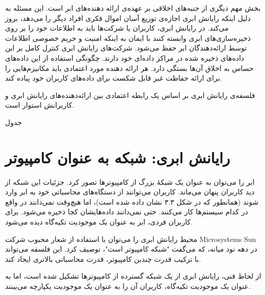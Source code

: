 \documentclass{book}
\begin{document}
            بخش مهم دیگری از جنبه‌های اخلاقی بر عهده‌ی ارائه دهنده‌های ابر است. این مسئله به دلیل اینکه رایانش ابری اجازه‌ی توزیع آسان اموال فکری افراد دیگر را می‌دهد، بروز می‌کند. در رایانش ابری، کاربران یا شرکت‌ها باید به اطلاعات خود را بر روی ذخیره‌سازی‌های ابری وابسته کنند با ایمان به اینکه امنیت و حریم خصوصی اطلاعات توسط ارائه‌دهندگان ابر حفظ می‌شود. شرکت‌های رایانش ابری کنترل کامل بر این داده‌های ذخیره شده در مراکز داده‌ای خود دارند. چگونگی استفاده از این داده‌های حساس به اخلاق آن‌ها بستگی دارد. هر ارائه دهنده مورد اعتمادی باید مکانیزم‌هایی را برای ارائه حفاظت غیر قابل شکست برای داده‌های کاربران خود پیاده کند.

            \begin{addinfo}
                
                فلسفه‌ی رایانش ابری بر اساس یک رابطه اعتمادی بین ارائه‌دهنده‌های رایانش ابری و کاربرانش استوار است.

            \end{addinfo}

            \begin{center}
                
                جدول

            \end{center}

        \section{رایانش ابری: شبکه به عنوان کامپیوتر}

            ابر را می‌توان به عنوان یک شبکهٔ بزرگ از کامپیوترها تصور کرد. جزئیات این شبکه از دید کاربران پنهان می‌ماند. کاربران می‌توانند از دستگاه‌های محاسباتی خود به ابر وارد شوند (همانطور که در شکل ۳.۳ نشان داده شده است)، اما هیچ‌وقت نمی‌دانند در واقع در کدام سیستم‌ها کار می‌کنند. حتی نمی‌دانند داده‌هایشان کجا ذخیره می‌شود. برای کاربران فردی، ابر به عنوان یک موجودیت تکیه‌گاه دیده می‌شود.

            محیط رایانش ابری را می‌توان با استفاده از شعار محبوب شرکت Microsystems Sun در دهه نود میانه، که می‌گفت "شبکه کامپیوتر است"، توصیف کرد. این فلسفه می‌تواند با ترکیب قدرت چندین کامپیوتر، قدرت محاسباتی بالاتری ایجاد کند.

            \begin{addinfo}
                
                از لحاظ فنی، رایانش ابری از یک شبکه گسترده از کامپیوترها تشکیل شده است، اما به عنوان یک موجودیت تکیه‌گاه، کاربران آن را به عنوان یک موجودیت یکپارچه می‌بینند.

            \end{addinfo}
\end{document}

